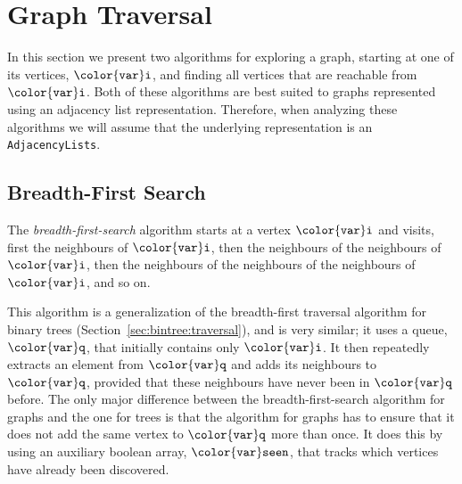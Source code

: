 \documentclass[10pt]{book}
\newcommand{\secref}[1]{Section~\ref{sec:#1}}
\theoremstyle{plain}
\theoremstyle{definition}
\begin{document}
\section{Graph Traversal}

In this section we present two algorithms for exploring a graph,
starting at one of its vertices, \ensuremath{\mathtt{{\color{var}i}}}, and finding all vertices that
are reachable from \ensuremath{\mathtt{{\color{var}i}}}.  Both of these algorithms are best suited to
graphs represented using an adjacency list representation.  Therefore,
when analyzing these algorithms we will assume that the underlying
representation is an \texttt{AdjacencyLists}.

\subsection{Breadth-First Search}

%
The \emph{breadth-first-search} algorithm starts at a vertex \ensuremath{\mathtt{{\color{var}i}}} and visits,
first the neighbours of \ensuremath{\mathtt{{\color{var}i}}}, then the neighbours of the neighbours of \ensuremath{\mathtt{{\color{var}i}}},
then the neighbours of the neighbours of the neighbours of \ensuremath{\mathtt{{\color{var}i}}}, and so on.

This algorithm is a generalization of the breadth-first traversal
algorithm for binary trees (\secref{bintree:traversal}), and is
very similar; it uses a queue, \ensuremath{\mathtt{{\color{var}q}}}, that initially contains only \ensuremath{\mathtt{{\color{var}i}}}.
It then repeatedly extracts an element from \ensuremath{\mathtt{{\color{var}q}}} and adds its neighbours
to \ensuremath{\mathtt{{\color{var}q}}}, provided that these neighbours have never been in \ensuremath{\mathtt{{\color{var}q}}} before.
The only major difference between the breadth-first-search algorithm
for graphs and the one for trees is that the algorithm for graphs has
to ensure that it does not add the same vertex to \ensuremath{\mathtt{{\color{var}q}}} more than once.
It does this by using an auxiliary boolean array, \ensuremath{\mathtt{{\color{var}seen}}}, that tracks
which vertices have already been discovered.
\end{document}

